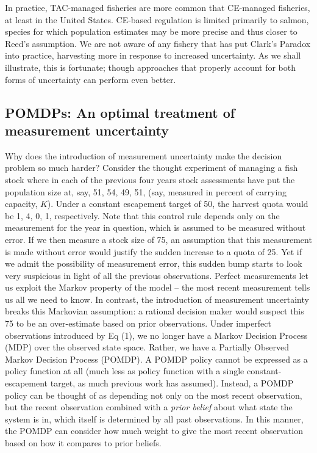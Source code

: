 \documentclass[3p]{elsarticle} %
\begin{document}
In practice, TAC-managed fisheries are more common that CE-managed
fisheries, at least in the United States. CE-based regulation is limited
primarily to salmon, species for which population estimates may be more
precise and thus closer to Reed's assumption. We are not aware of any
fishery that has put Clark's Paradox into practice, harvesting more in
response to increased uncertainty. As we shall illustrate, this is
fortunate; though approaches that properly account for both forms of
uncertainty can perform even better.

\hypertarget{pomdps-an-optimal-treatment-of-measurement-uncertainty}{%
\subsection{POMDPs: An optimal treatment of measurement
uncertainty}\label{pomdps-an-optimal-treatment-of-measurement-uncertainty}}

Why does the introduction of measurement uncertainty make the decision
problem so much harder? Consider the thought experiment of managing a
fish stock where in each of the previous four years stock assessments
have put the population size at, say, 51, 54, 49, 51, (say, measured in
percent of carrying capacity, \(K\)). Under a constant escapement target
of 50, the harvest quota would be 1, 4, 0, 1, respectively. Note that
this control rule depends only on the measurement for the year in
question, which is assumed to be measured without error. If we then
measure a stock size of 75, an assumption that this measurement is made
without error would justify the sudden increase to a quota of 25. Yet if
we admit the possibility of measurement error, this sudden bump starts
to look very suspicious in light of all the previous observations.
Perfect measurements let us exploit the Markov property of the model --
the most recent measurement tells us all we need to know. In contrast,
the introduction of measurement uncertainty breaks this Markovian
assumption: a rational decision maker would suspect this 75 to be an
over-estimate based on prior observations. Under imperfect observations
introduced by Eq (1), we no longer have a Markov Decision Process (MDP)
over the observed state space. Rather, we have a Partially Observed
Markov Decision Process (POMDP). A POMDP policy cannot be expressed as a
policy function at all (much less as policy function with a single
constant-escapement target, as much previous work has assumed). Instead,
a POMDP policy can be thought of as depending not only on the most
recent observation, but the recent observation combined with a
\emph{prior belief} about what state the system is in, which itself is
determined by all past observations. In this manner, the POMDP can
consider how much weight to give the most recent observation based on
how it compares to prior beliefs.
\end{document}
